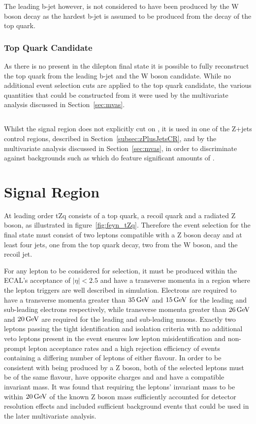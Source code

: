 The leading b-jet however, is not considered to have been produced by the W boson decay as the hardest b-jet is assumed to be produced from the decay of the top quark.

\subsubsection{Top Quark Candidate}
As there is no \MET present in the dilepton final state it is possible to fully reconstruct the top quark from the leading b-jet and the W boson candidate.
While no additional event selection cuts are applied to the top quark candidate, the various quantities that could be constructed from it were used by the multivariate analysis discussed in Section~\ref{sec:mvas}.

\subsection{\MET}\label{subsec:met}
Whilst the signal region does not explicitly cut on \MET, it is used in one of the Z+jets control regions, described in Section~\ref{subsec:zPlusJetsCR}, and by the multivariate analysis discussed in Section~\ref{sec:mvas}, in order to discriminate against backgrounds such as \ttbar which do feature significant amounts of \MET.

\section{Signal Region}\label{sec:signalRegion}
At leading order tZq consists of a top quark, a recoil quark and a radiated Z boson, as illustrated in figure~\ref{fig:feyn_tZq}.
Therefore the event selection for the final state must consist of two leptons compatible with a Z boson decay and at least four jets, one from the top quark decay, two from the W boson, and the recoil jet.

For any lepton to be considered for selection, it must be produced within the ECAL's acceptance of $|\eta| < 2.5$ and have a transverse momenta in a region where the lepton triggers are well described in simulation.
Electrons are required to have a transverse momenta greater than $35\,\text{Ge\hspace{-.08em}V}$ and $15\,\text{Ge\hspace{-.08em}V}$ for the leading and sub-leading electrons respectively, while transverse momenta greater than $26\,\text{Ge\hspace{-.08em}V}$ and $20\,\text{Ge\hspace{-.08em}V}$ are required for the leading and sub-leading muons.
Exactly two leptons passing the tight identification and isolation criteria with no additional veto leptons present in the event ensures low lepton misidentification and non-prompt lepton acceptance rates and a high rejection efficiency of events containing a differing number of leptons of either flavour.
In order to be consistent with being produced by a Z boson, both of the selected leptons must be of the same flavour, have opposite charges and and have a compatible invariant mass.
It was found that requiring the leptons' invariant mass to be within $20\,\text{Ge\hspace{-.08em}V}$ of the known Z boson mass sufficiently accounted for detector resolution effects and included sufficient background events that could be used in the later multivariate analysis.

